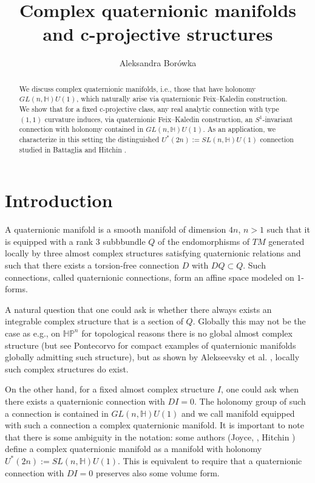 \documentclass{amsart}
\begin{document}
\title{Complex quaternionic manifolds and c-projective structures}
\author{Aleksandra Borówka}
\address[1]{Institute of Mathematics, Jagiellonian University in Krak\'ow\\Poland}


\begin{abstract}
We discuss complex quaternionic manifolds, i.e., those that have holonomy $GL(n,\mathbb{H})U(1)$, which naturally arise via quaternionic Feix--Kaledin construction. We show that for a fixed c-projective class, any real analytic connection with type $(1,1)$ curvature induces, via quaternionic Feix--Kaledin construction, an $S^1$-invariant connection with holonomy contained in  $GL(n,\mathbb{H})U(1)$. As an application, we characterize in this setting the distinguished $U^*(2n):=SL(n,\mathbb{H})U(1)$ connection studied in Battaglia \cite{Bat} and Hitchin \cite{Hit3}.
\end{abstract}
\maketitle
\section{Introduction}
A quaternionic manifold is a smooth manifold of dimension $4n$, $n>1$ such that it is equipped with a rank $3$
subbbundle $Q$ of the endomorphisms of $TM$ generated locally by three almost complex structures satisfying quaternionic relations and such that there exists a torsion-free connection $D$ with $DQ\subset Q$. Such connections, called quaternionic connections, form an affine space modeled on $1$-forms.

A natural question that one could ask is whether there always exists an integrable complex structure that is a section of $Q$. Globally this may not be the case as e.g., on $\mathbb{HP}^n$ for topological reasons there is no global almost complex structure (but see Pontecorvo \cite{Pon} for compact examples of quaternionic manifolds globally admitting such structure), but as shown by Alekseevsky et al. \cite{AMP}, locally such complex structures do exist.

On the other hand, for a fixed almost complex structure $I$, one could ask when there exists a quaternionic connection with $DI=0$. The holonomy group of such a connection is contained in $GL(n,\mathbb{H})U(1)$ and we call manifold equipped with such a connection a complex quaternionic manifold.  It is important to note that there is some ambiguity in the notation: some authors (Joyce, \cite{Joyce}, Hitchin \cite{Hit3}) define a  complex quaternionic  manifold as a manifold with holonomy $U^*(2n):=SL(n,\mathbb{H})U(1)$. This is equivalent to require that a quaternionic connection with $DI=0$ preserves also some volume form.
\end{document}
